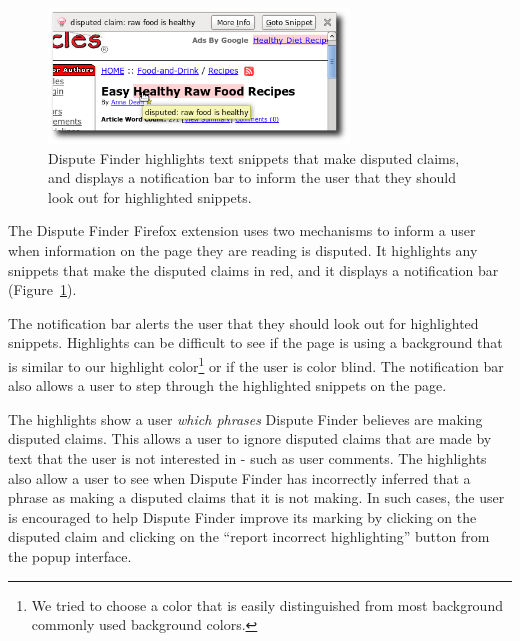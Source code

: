\documentclass{www2010-submission}
\begin{document}
\begin{figure}[tb]
	\begin{center}
	\includegraphics[width=8cm]{pictures/highlight_bar.png}
	\caption{Dispute Finder highlights text snippets that make disputed claims, and displays a notification bar to inform the user that they should look out for highlighted snippets.}
	\label{highlight_bar}
	\end{center}
\end{figure}

%
%

The Dispute Finder Firefox extension uses two mechanisms to inform a user when information on the page they are reading is disputed. It highlights any snippets that make the disputed claims in red, and it displays a notification bar (Figure~\ref{highlight_bar}). 

The notification bar alerts the user that they should look out for highlighted snippets. Highlights can be difficult to see if the page is using a background that is similar to our highlight color\footnote{We tried to choose a color that is easily distinguished from most background commonly used background colors.} or if the user is color blind. The notification bar also allows a user to step through the highlighted snippets on the page.

The highlights show a user {\it which phrases} Dispute Finder believes are making disputed claims. This allows a user to ignore disputed claims that are made by text that the user is not interested in - such as user comments. The highlights also allow a user to see when Dispute Finder has incorrectly inferred that a phrase as making a disputed claims that it is not making. In such cases, the user is encouraged to help Dispute Finder improve its marking by clicking on the disputed claim and clicking on the ``report incorrect highlighting'' button from the popup interface.
\end{document}
